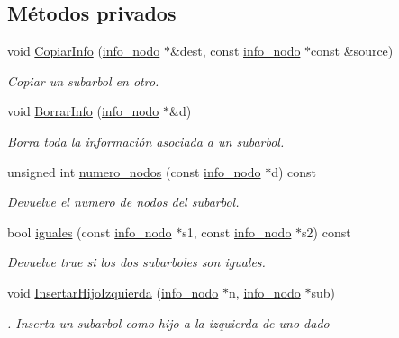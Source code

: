 \subsection*{Métodos privados}
\begin{DoxyCompactItemize}
\item 
void \hyperlink{classArbolBinario_a2f4333678ab24a80ea88f05151d3b5ab}{Copiar\+Info} (\hyperlink{structArbolBinario_1_1info__nodo}{info\+\_\+nodo} $\ast$\&dest, const \hyperlink{structArbolBinario_1_1info__nodo}{info\+\_\+nodo} $\ast$const \&source)
\begin{DoxyCompactList}\small\item\em Copiar un subarbol en otro. \end{DoxyCompactList}\item 
void \hyperlink{classArbolBinario_a9a9320b7ec787b55a9fd65c041fea135}{Borrar\+Info} (\hyperlink{structArbolBinario_1_1info__nodo}{info\+\_\+nodo} $\ast$\&d)
\begin{DoxyCompactList}\small\item\em Borra toda la información asociada a un subarbol. \end{DoxyCompactList}\item 
unsigned int \hyperlink{classArbolBinario_abd35b63011c7bc50852ab039ea8500f0}{numero\+\_\+nodos} (const \hyperlink{structArbolBinario_1_1info__nodo}{info\+\_\+nodo} $\ast$d) const
\begin{DoxyCompactList}\small\item\em Devuelve el numero de nodos del subarbol. \end{DoxyCompactList}\item 
bool \hyperlink{classArbolBinario_a8618907c8154d008f64252403e871bf4}{iguales} (const \hyperlink{structArbolBinario_1_1info__nodo}{info\+\_\+nodo} $\ast$s1, const \hyperlink{structArbolBinario_1_1info__nodo}{info\+\_\+nodo} $\ast$s2) const
\begin{DoxyCompactList}\small\item\em Devuelve true si los dos subarboles son iguales. \end{DoxyCompactList}\item 
void \hyperlink{classArbolBinario_aca7d7c365ead3aa2040ffc64e1dfb1f4}{Insertar\+Hijo\+Izquierda} (\hyperlink{structArbolBinario_1_1info__nodo}{info\+\_\+nodo} $\ast$n, \hyperlink{structArbolBinario_1_1info__nodo}{info\+\_\+nodo} $\ast$sub)
\begin{DoxyCompactList}\small\item\em . Inserta un subarbol como hijo a la izquierda de uno dado \end{DoxyCompactList}\item 

\end{DoxyCompactItemize}
